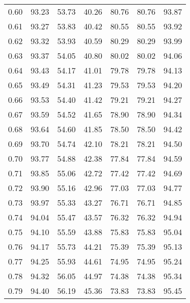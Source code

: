 \begin{tabular}{|c|c|c|c|c|c|c|}
      0.60 &     93.23 &     53.73 &      40.26 &   80.76 &      80.76 &         93.87 \\
      0.61 &     93.27 &     53.83 &      40.42 &   80.55 &      80.55 &         93.92 \\
      0.62 &     93.32 &     53.93 &      40.59 &   80.29 &      80.29 &         93.99 \\
      0.63 &     93.37 &     54.05 &      40.80 &   80.02 &      80.02 &         94.06 \\
      0.64 &     93.43 &     54.17 &      41.01 &   79.78 &      79.78 &         94.13 \\
      0.65 &     93.49 &     54.31 &      41.23 &   79.53 &      79.53 &         94.20 \\
      0.66 &     93.53 &     54.40 &      41.42 &   79.21 &      79.21 &         94.27 \\
      0.67 &     93.59 &     54.52 &      41.65 &   78.90 &      78.90 &         94.34 \\
      0.68 &     93.64 &     54.60 &      41.85 &   78.50 &      78.50 &         94.42 \\
      0.69 &     93.70 &     54.74 &      42.10 &   78.21 &      78.21 &         94.50 \\
      0.70 &     93.77 &     54.88 &      42.38 &   77.84 &      77.84 &         94.59 \\
      0.71 &     93.85 &     55.06 &      42.72 &   77.42 &      77.42 &         94.69 \\
      0.72 &     93.90 &     55.16 &      42.96 &   77.03 &      77.03 &         94.77 \\
      0.73 &     93.97 &     55.33 &      43.27 &   76.71 &      76.71 &         94.85 \\
      0.74 &     94.04 &     55.47 &      43.57 &   76.32 &      76.32 &         94.94 \\
      0.75 &     94.10 &     55.59 &      43.88 &   75.83 &      75.83 &         95.04 \\
      0.76 &     94.17 &     55.73 &      44.21 &   75.39 &      75.39 &         95.13 \\
      0.77 &     94.25 &     55.93 &      44.61 &   74.95 &      74.95 &         95.24 \\
      0.78 &     94.32 &     56.05 &      44.97 &   74.38 &      74.38 &         95.34 \\
      0.79 &     94.40 &     56.19 &      45.36 &   73.83 &      73.83 &         95.45 \\

\end{tabular}
